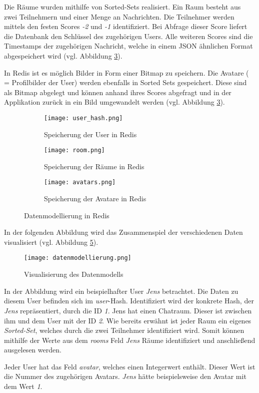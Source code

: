 Die Räume wurden mithilfe von Sorted-Sets realisiert. Ein Raum besteht aus zwei Teilnehmern und einer Menge an Nachrichten. Die Teilnehmer werden mittels den festen Scores \textit{-2} und \textit{-1} identifiziert. Bei Abfrage dieser Score liefert die Datenbank den Schlüssel des zugehörigen Users. Alle weiteren Scores sind die Timestamps der zugehörigen Nachricht, welche in einem \acs{JSON} ähnlichen Format abgespeichert wird (vgl. Abbildung \ref{fig:sub3}).

In \acs{Redis} ist es möglich Bilder in Form einer Bitmap zu speichern. Die Avatare ( = Profilbilder der User) werden ebenfalls in Sorted Sets gespeichert. Diese sind als Bitmap abgelegt und können anhand ihres Scores abgefragt und in der Applikation zurück in ein Bild umgewandelt werden (vgl. Abbildung \ref{fig:sub3}).
\begin{figure}[h]
	\centering
	
	\begin{subfigure}{0.3\textwidth}
		\centering
		\texttt{[image: user\_hash.png]}
		\caption{Speicherung der User in \acs{Redis}}
		\label{fig:sub1}
	\end{subfigure}%
	\hspace{0.02\textwidth}
	\begin{subfigure}{0.3\textwidth}
		\centering
		\texttt{[image: room.png]}
		\caption{Speicherung der Räume in \acs{Redis}}
		\label{fig:sub2}
	\end{subfigure}%
	\hspace{0.02\textwidth}
	\begin{subfigure}{0.3\textwidth}
		\centering
		\texttt{[image: avatars.png]}
		\caption{Speicherung der Avatare in \acs{Redis}}
		\label{fig:sub3}
	\end{subfigure}
	
	\caption{Datenmodellierung in \acs{Redis}}
	\label{fig:overall}
\end{figure}

In der folgenden Abbildung wird das Zusammenspiel der verschiedenen Daten visualisiert (vgl. Abbildung \ref{fig:datenmodell}). 
\begin{figure}[h]
	\centering
	\texttt{[image: datenmodellierung.png]}
	\caption{Visualisierung des Datenmodells}
	\label{fig:datenmodell}
\end{figure}

In der Abbildung wird ein beispielhafter User \textit{Jens} betrachtet. Die Daten zu diesem User befinden sich im \textit{user}-Hash. Identifiziert wird der konkrete Hash, der \textit{Jens} repräsentiert, durch die ID \textit{1}. Jens hat einen Chatraum. Dieser ist zwischen ihm und dem User mit der ID \textit{2}. Wie bereits erwähnt ist jeder Raum ein eigenes \textit{Sorted-Set}, welches durch die zwei Teilnehmer identifiziert wird. Somit können mithilfe der Werte aus dem \textit{rooms} Feld \textit{Jens} Räume identifiziert und anschließend ausgelesen werden.

Jeder User hat das Feld \textit{avatar}, welches einen Integerwert enthält. Dieser Wert ist die Nummer des zugehörigen Avatars. \textit{Jens} hätte beispielsweise den Avatar mit dem Wert \textit{1}.
